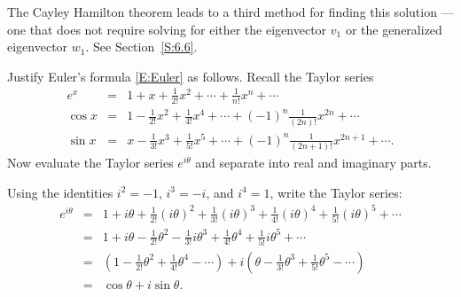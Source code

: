 \documentclass{ximera}
\begin{document}
The Cayley Hamilton theorem leads to a third method for finding this solution 
--- one that does not require solving for either the eigenvector $v_1$ or the 
generalized eigenvector $w_1$.  See Section~\ref{S:6.6}.

\EXER

\TEXER

\begin{exercise}  \label{c6.6.05}
Justify Euler's formula \eqref{E:Euler} as follows.  Recall the
Taylor series
\begin{eqnarray*}
e^x & = & 1 + x + \frac{1}{2!}x^2 + \cdots + \frac{1}{n!}x^n + \cdots\\
\cos x & = & 1 - \frac{1}{2!}x^2 + \frac{1}{4!}x^4 + \cdots +
(-1)^n \frac{1}{(2n)!}x^{2n} + \cdots \\
\sin x & = & x - \frac{1}{3!}x^3 + \frac{1}{5!}x^5 + \cdots +
(-1)^n \frac{1}{(2n+1)!}x^{2n+1} + \cdots.
\end{eqnarray*}
Now evaluate the Taylor series $e^{i\theta}$ and separate into real and
imaginary parts.

\begin{solution}

Using the identities $i^2 = -1$, $i^3 = -i$, and $i^4 = 1$, write
the Taylor series:
\[
\begin{array}{rcl}
e^{i\theta} & = & 1 + i\theta + \frac{1}{2!}(i\theta)^2 +
\frac{1}{3!}(i\theta)^3 + \frac{1}{4!}(i\theta)^4 +
\frac{1}{5!}(i\theta)^5 + \cdots \\
& = & 1 + i\theta - \frac{1}{2!}\theta^2 - \frac{1}{3!}i\theta^3 +
\frac{1}{4!}\theta^4 + \frac{1}{5!}i\theta^5 + \cdots \\
& = & (1 - \frac{1}{2!}\theta^2 + \frac{1}{4!}\theta^4 - \cdots)
+ i(\theta - \frac{1}{3!}\theta^3 + \frac{1}{5!}\theta^5 - \cdots) \\
& = & \cos\theta + i\sin\theta. \end{array}
\]


\end{solution}
\end{exercise}
\end{document}
